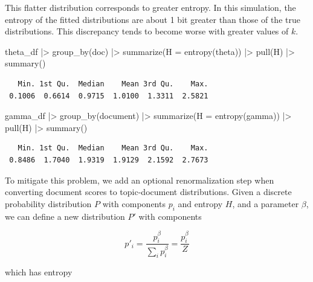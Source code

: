 \documentclass[
]{article}
\newenvironment{Shaded}{\begin{snugshade}}{\end{snugshade}}
\newcommand{\AttributeTok}[1]{\textcolor[rgb]{0.40,0.45,0.13}{#1}}
\newcommand{\FunctionTok}[1]{\textcolor[rgb]{0.28,0.35,0.67}{#1}}
\newcommand{\NormalTok}[1]{\textcolor[rgb]{0.00,0.23,0.31}{#1}}
\newcommand{\SpecialCharTok}[1]{\textcolor[rgb]{0.37,0.37,0.37}{#1}}
\begin{document}
This flatter distribution corresponds to greater entropy. In this
simulation, the entropy of the fitted distributions are about 1 bit
greater than those of the true distributions. This discrepancy tends to
become worse with greater values of \(k\).

\begin{Shaded}
\begin{Highlighting}[]
\NormalTok{theta\_df }\SpecialCharTok{|\textgreater{}} 
    \FunctionTok{group\_by}\NormalTok{(doc) }\SpecialCharTok{|\textgreater{}} 
    \FunctionTok{summarize}\NormalTok{(}\AttributeTok{H =} \FunctionTok{entropy}\NormalTok{(theta)) }\SpecialCharTok{|\textgreater{}} 
    \FunctionTok{pull}\NormalTok{(H) }\SpecialCharTok{|\textgreater{}} 
    \FunctionTok{summary}\NormalTok{()}
\end{Highlighting}
\end{Shaded}

\begin{verbatim}
   Min. 1st Qu.  Median    Mean 3rd Qu.    Max. 
 0.1006  0.6614  0.9715  1.0100  1.3311  2.5821 
\end{verbatim}

\begin{Shaded}
\begin{Highlighting}[]
\NormalTok{gamma\_df }\SpecialCharTok{|\textgreater{}} 
    \FunctionTok{group\_by}\NormalTok{(document) }\SpecialCharTok{|\textgreater{}} 
    \FunctionTok{summarize}\NormalTok{(}\AttributeTok{H =} \FunctionTok{entropy}\NormalTok{(gamma)) }\SpecialCharTok{|\textgreater{}} 
    \FunctionTok{pull}\NormalTok{(H) }\SpecialCharTok{|\textgreater{}} 
    \FunctionTok{summary}\NormalTok{()}
\end{Highlighting}
\end{Shaded}

\begin{verbatim}
   Min. 1st Qu.  Median    Mean 3rd Qu.    Max. 
 0.8486  1.7040  1.9319  1.9129  2.1592  2.7673 
\end{verbatim}

To mitigate this problem, we add an optional renormalization step when
converting document scores to topic-document distributions. Given a
discrete probability distribution \(P\) with components \(p_i\) and
entropy \(H\), and a parameter \(\beta\), we can define a new
distribution \(P'\) with components

\[ p'_i = \frac{p_i^\beta}{\sum_i p_i^\beta} = \frac{p_i^\beta}{Z}\]

which has entropy
\end{document}
